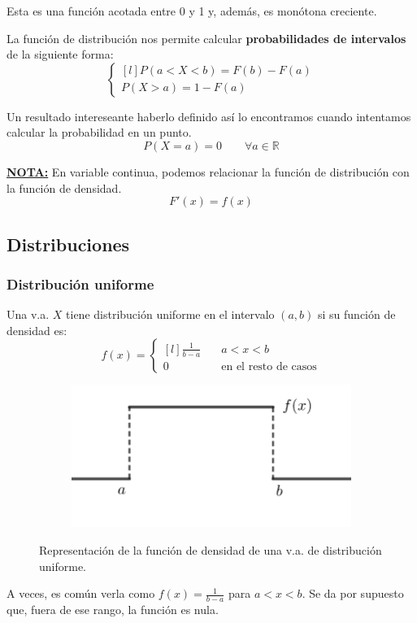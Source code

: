 \documentclass[a4paper]{book}
\numberwithin{figure}{section}
\numberwithin{equation}{subsection}
\numberwithin{figure}{chapter}
\theoremstyle{definition}
\newenvironment{nota}{\underline{\textbf{NOTA:}}}{}
\begin{document}
Esta es una función acotada entre 0 y 1 y, además, es monótona creciente.

La función de distribución nos permite calcular \textbf{probabilidades de intervalos} de la siguiente forma: \[\left\{ \begin{matrix*}[l]
		P(a<X<b) = F(b) - F(a)\\[5pt]
		P(X>a) = 1 - F(a) \end{matrix*}\right.\]

Un resultado intereseante haberlo definido así lo encontramos cuando intentamos calcular la probabilidad en un punto. \[P(X=a) = 0 \qquad \forall a \in \mathbb{R}\]

\begin{nota}
	En variable continua, podemos relacionar la función de distribución con la función de densidad.
	\[F'(x) = f(x)\]
\end{nota}


\subsection{Distribuciones}
\subsubsection{Distribución uniforme}
Una v.a. $X$ tiene distribución uniforme en el intervalo $(a,b)$ si su función de densidad es: \[f(x) = \left\{ \begin{matrix*}[l]
		\displaystyle{\frac{1}{b-a}} & \quad a<x<b\\[15pt]
		0 & \quad \text{en el resto de casos}
	\end{matrix*}\right.\]

\begin{figure}[h!]
	\begin{subfigure}[b]{\linewidth}
		\centering
		\includegraphics[width=0.4\linewidth]{aaa.png}
	\end{subfigure}
	\caption{Representación de la función de densidad de una v.a. de distribución uniforme.}
\end{figure}

A veces, es común verla como $f(x) = \frac{1}{b-a}$ para $a<x<b$. Se da por supuesto que, fuera de ese rango, la función es nula.
\end{document}
